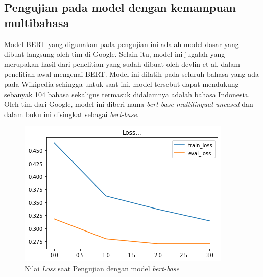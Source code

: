 \subsection{Pengujian pada model dengan kemampuan multibahasa}

Model BERT yang digunakan pada pengujian ini adalah model dasar yang dibuat langsung oleh tim di Google. Selain itu, model ini jugalah yang merupakan hasil dari penelitian yang sudah dibuat oleh devlin et al. dalam penelitian awal mengenai BERT. Model ini dilatih pada seluruh bahasa yang ada pada Wikipedia sehingga untuk saat ini, model tersebut dapat mendukung sebanyak 104 bahasa sekaligus termasuk didalamnya adalah bahasa Indonesia. Oleh tim dari Google, model ini diberi nama \textit{bert-base-multilingual-uncased} dan dalam buku ini disingkat sebagai \textit{bert-base}.

\begin{figure}[h]
    \begin{center}
        \includegraphics[width= 0.9\linewidth]{gambar/loss_bert_multilingual.png}
        \caption{Nilai \textit{Loss} saat Pengujian dengan model \textit{bert-base}}
        \label{fig: loss_bert_multilingual}
    \end{center}
\end{figure}

